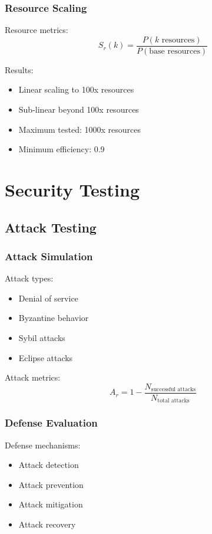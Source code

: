 \documentclass[12pt]{article}
\begin{document}
\subsubsection{Resource Scaling}

Resource metrics:
\begin{equation}
S_r(k) = \frac{P(k\text{ resources})}{P(\text{base resources})}
\end{equation}

Results:
\begin{itemize}
\item Linear scaling to 100x resources
\item Sub-linear beyond 100x resources
\item Maximum tested: 1000x resources
\item Minimum efficiency: 0.9
\end{itemize}

\section{Security Testing}

\subsection{Attack Testing}

\subsubsection{Attack Simulation}

Attack types:
\begin{itemize}
\item Denial of service
\item Byzantine behavior
\item Sybil attacks
\item Eclipse attacks
\end{itemize}

Attack metrics:
\begin{equation}
A_r = 1 - \frac{N_{\text{successful attacks}}}{N_{\text{total attacks}}}
\end{equation}

\subsubsection{Defense Evaluation}

Defense mechanisms:
\begin{itemize}
\item Attack detection
\item Attack prevention
\item Attack mitigation
\item Attack recovery
\end{itemize}
\end{document}
